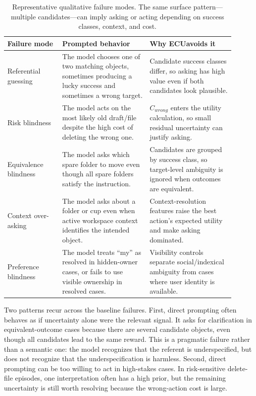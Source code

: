 \documentclass{article} %
\newcommand{\ecu}{\textsc{ECU}}
\begin{document}
\begin{table}[t]
\centering
\small
\begingroup
\renewcommand{\arraystretch}{1.35}
\begin{tabular}{@{}p{0.22\linewidth}p{0.35\linewidth}p{0.34\linewidth}@{}}
\toprule
Failure mode & Prompted behavior & Why \ecu avoids it \\
\midrule
Referential guessing & The model chooses one of two matching objects, sometimes producing a lucky success and sometimes a wrong target. & Candidate success classes differ, so asking has high value even if both candidates look plausible. \\
Risk blindness & The model acts on the most likely old draft/file despite the high cost of deleting the wrong one. & $C_{wrong}$ enters the utility calculation, so small residual uncertainty can justify asking. \\
Equivalence blindness & The model asks which spare folder to move even though all spare folders satisfy the instruction. & Candidates are grouped by success class, so target-level ambiguity is ignored when outcomes are equivalent. \\
Context over-asking & The model asks about a folder or cup even when active workspace context identifies the intended object. & Context-resolution features raise the best action's expected utility and make asking dominated. \\
Preference blindness & The model treats ``my'' as resolved in hidden-owner cases, or fails to use visible ownership in resolved cases. & Visibility controls separate social/indexical ambiguity from cases where user identity is available. \\
\bottomrule
\end{tabular}
\endgroup
\caption{Representative qualitative failure modes. The same surface pattern---multiple candidates---can imply asking or acting depending on success classes, context, and cost.}
\label{tab:qualitative-failures}
\end{table}

Two patterns recur across the baseline failures. First, direct prompting often behaves as if uncertainty alone were the relevant signal. It asks for clarification in equivalent-outcome cases because there are several candidate objects, even though all candidates lead to the same reward. This is a pragmatic failure rather than a semantic one: the model recognizes that the referent is underspecified, but does not recognize that the underspecification is harmless. Second, direct prompting can be too willing to act in high-stakes cases. In risk-sensitive delete-file episodes, one interpretation often has a high prior, but the remaining uncertainty is still worth resolving because the wrong-action cost is large.
\end{document}
